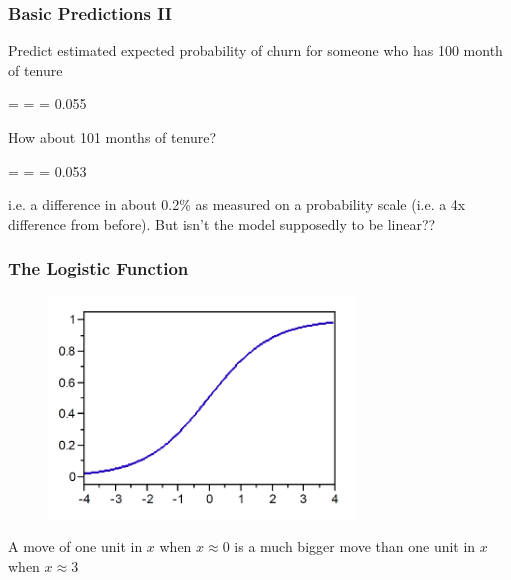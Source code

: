 \documentclass[slides]{beamer} %
\begin{document}
\begin{frame}\frametitle{Basic Predictions II}

Predict estimated expected probability of churn for someone who has 100 month of tenure \pause

\beqn
\phat =  =  = 0.055
\eeqn

How about 101 months of tenure? \pause

\beqn
\phat =  =  = 0.053
\eeqn

i.e. a difference in about 0.2\% as measured on a probability scale (i.e. a 4x difference from before). But isn't the model supposedly to be linear??

\end{frame}

\begin{frame}\frametitle{The Logistic Function}

\begin{figure}
\centering
\includegraphics[width=3.2in]{logistic_function.png}
\end{figure}

A move of one unit in $x$ when $x \approx 0$ is a much bigger move than one unit in $x$ when $x \approx 3$

\end{frame}
\end{document}
